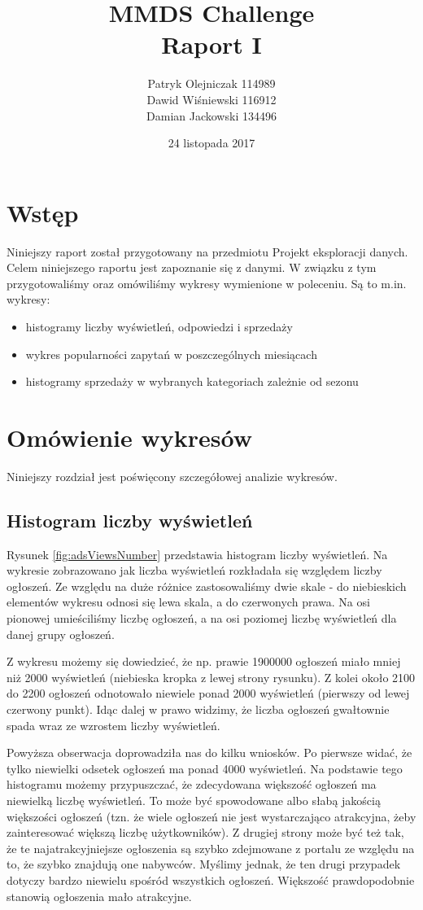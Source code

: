 \documentclass[a4paper,11pt]{article}
\author{Patryk Olejniczak 114989\\ Dawid Wiśniewski 116912 \\ Damian Jackowski 134496}
\title{MMDS Challenge\\
\large{{\bf Raport I}  }}
\date{24 listopada 2017}
\begin{document}
\maketitle 

\section{Wstęp}
Niniejszy raport został przygotowany na przedmiotu Projekt eksploracji danych. Celem niniejszego raportu jest zapoznanie się z danymi. W związku z tym przygotowaliśmy oraz omówiliśmy wykresy wymienione w poleceniu. Są to m.in. wykresy:
\begin{itemize}
\item histogramy liczby wyświetleń, odpowiedzi i sprzedaży
\item wykres popularności zapytań w poszczególnych miesiącach
\item histogramy sprzedaży w wybranych kategoriach zależnie od sezonu
\end{itemize}

\section{Omówienie wykresów}
Niniejszy rozdział jest poświęcony szczegółowej analizie wykresów.

\subsection{Histogram liczby wyświetleń}
Rysunek \ref{fig:adsViewsNumber} przedstawia histogram liczby wyświetleń. Na wykresie zobrazowano jak liczba wyświetleń rozkładała się względem liczby ogłoszeń. Ze względu na duże różnice zastosowaliśmy dwie skale - do niebieskich elementów wykresu odnosi się lewa skala, a do czerwonych prawa. Na osi pionowej umieściliśmy liczbę ogłoszeń, a na osi poziomej liczbę wyświetleń dla danej grupy ogłoszeń.

Z wykresu możemy się dowiedzieć, że np. prawie 1900000 ogłoszeń miało mniej niż 2000 wyświetleń (niebieska kropka z lewej strony rysunku). Z kolei około 2100 do 2200 ogłoszeń odnotowało niewiele ponad 2000 wyświetleń (pierwszy od lewej czerwony punkt). Idąc dalej w prawo widzimy, że liczba ogłoszeń gwałtownie spada wraz ze wzrostem liczby wyświetleń.

Powyższa obserwacja doprowadziła nas do kilku wniosków. Po pierwsze widać, że tylko niewielki odsetek ogłoszeń ma ponad 4000 wyświetleń. Na podstawie tego histogramu możemy przypuszczać, że zdecydowana większość ogłoszeń ma niewielką liczbę wyświetleń. To może być spowodowane albo słabą jakością większości ogłoszeń (tzn. że  wiele ogłoszeń nie jest wystarczająco atrakcyjna, żeby zainteresować większą liczbę użytkowników). Z drugiej strony może być też tak, że te najatrakcyjniejsze ogłoszenia są szybko zdejmowane z portalu ze względu na to, że szybko znajdują one nabywców. Myślimy jednak, że ten drugi przypadek dotyczy bardzo niewielu spośród wszystkich ogłoszeń. Większość prawdopodobnie stanowią ogłoszenia mało atrakcyjne.
\end{document}
